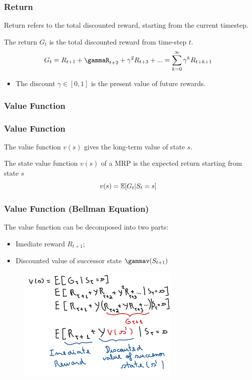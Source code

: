 \begin{frame}
    \frametitle{Return}
 
    \centering
    {\color{red}Return refers to the total discounted reward, starting from the current timestep.}

    \begin{definition}
        The return $G_t$ is the total discounted reward from time-step $t$.
        $$G_t = R_{t+1} + \gammaR_{t+2} + \gamma^{2}R_{t+3} + ... = \sum_{k=0}^{\infty}\gamma^{k}R_{t+k+1}$$
        \begin{itemize}
            \item The discount $\gamma\in[0,1]$ is the present value of future rewards.
        \end{itemize}
    \end{definition}

\end{frame}

\subsubsection{Value Function}

\begin{frame}
    \frametitle{Value Function}
    \centering
    {\color{red}The value function $v(s)$ gives the long-term value of state $s$.}

    \begin{definition}
        The state value function $v(s)$ of a MRP is the expected return starting from state $s$
        $$v(s)=\operatorname*{\mathbb{E}}[G_t|S_t=s]$$
    \end{definition}
\end{frame}



\begin{frame}
    \frametitle{Value Function (Bellman Equation)}
    The value function can be decomposed into two parts:
    \begin{itemize}
        \item Imediate reward $R_{t+1}$;
        \item Discounted value of successor state $\gammav(S_{t+1})$
    \end{itemize}

    \begin{figure}
        \centering
        \includegraphics[width=0.7\textwidth]{sections/markov/figures/v_s.pdf}
    \end{figure}

\end{frame}

